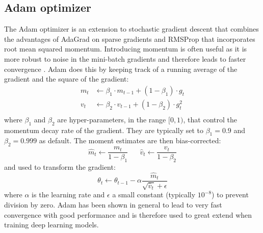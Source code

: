 \documentclass[a4paper,11pt]{article} %
\begin{document}
\subsection{Adam optimizer}
The Adam optimizer \cite{kingma2014adam} is an extension to stochastic gradient descent that combines the advantages of AdaGrad \cite{duchi2011adaptive} on sparse gradients and RMSProp \cite{hinton2012rmsprop} that incorporates root mean squared momentum. Introducing momentum is often useful as it is more robust to noise in the mini-batch gradients and therefore leads to faster convergence \cite{QIAN1999145}. Adam does this by keeping track of a running average of the gradient and the square of the gradient:
\begin{equation}
  \begin{split}
    m_t &\leftarrow \beta_1 \cdot m_{t-1} + (1-\beta_1) \cdot g_t \\
    v_t &\leftarrow \beta_2 \cdot v_{t-1} + (1-\beta_2) \cdot g_t^2 \\
  \end{split}
\end{equation}
where $\beta_1$ and $\beta_2$ are hyper-parameters, in the range $[0, 1)$, that control the momentum decay rate of the gradient. They are typically set to $\beta_1 = 0.9$ and $\beta_2 = 0.999$ as default. The moment estimates are then bias-corrected:
\begin{equation}
    \hat{m}_t \leftarrow  \frac{m_t}{1-\beta_1} \hspace{20pt} \hat{v}_t \leftarrow \frac{v_t}{1-\beta_2}
\end{equation}
and used to transform the gradient:
\begin{equation}
  \theta_t \leftarrow \theta_{t-1} - \alpha \frac{\hat{m}_t}{\sqrt{\hat{v}_t} + \epsilon}
\end{equation}
where $\alpha$ is the learning rate and $\epsilon$ a small constant (typically $10^{-8}$) to prevent division by zero. Adam has been shown in general to lead to very fast convergence with good performance and is therefore used to great extend when training deep learning models. 

\end{document}
